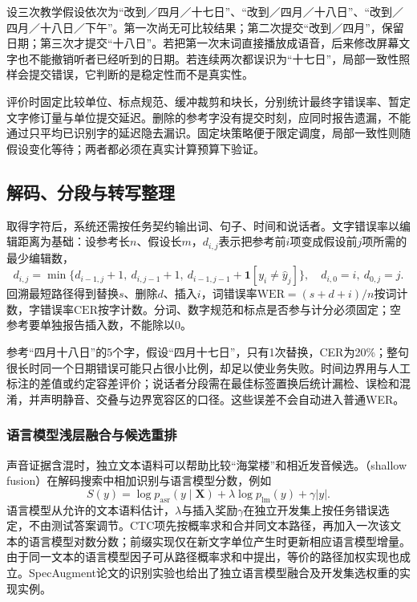 设三次教学假设依次为“改到／四月／十七日”、“改到／四月／十八日”、“改到／四月／十八日／下午”。第一次尚无可比较结果；第二次提交“改到／四月”，保留日期；第三次才提交“十八日”。若把第一次末词直接播放成语音，后来修改屏幕文字也不能撤销听者已经听到的日期。若连续两次都误识为“十七日”，局部一致性照样会提交错误，它判断的是稳定性而不是真实性。

评价时固定比较单位、标点规范、缓冲裁剪和块长，分别统计最终字错误率、暂定文字修订量与单位提交延迟。删除的参考字没有提交时刻，应同时报告遗漏，不能通过只平均已识别字的延迟隐去漏识。固定块策略便于限定调度，局部一致性则随假设变化等待；两者都必须在真实计算预算下验证。

\subsection{解码、分段与转写整理}
\label{sec:nlp-speech-postprocessing}

取得字符后，系统还需按任务契约输出词、句子、时间和说话者。文字错误率以编辑距离为基础：设参考长$n$、假设长$m$，$d_{i,j}$表示把参考前$i$项变成假设前$j$项所需的最少编辑数，
\begin{equation}
 d_{i,j}=\min\{d_{i-1,j}+1,\ d_{i,j-1}+1,\
              d_{i-1,j-1}+\mathbf{1}[y_i\ne\hat y_j]\},
 \quad d_{i,0}=i,\ d_{0,j}=j.
 \label{eq:nlp-speech-edit-distance}
\end{equation}
回溯最短路径得到替换$s$、删除$d$、插入$i$，词错误率$\mathrm{WER}=(s+d+i)/n$按词计数，字错误率$\mathrm{CER}$按字计数。分词、数字规范和标点是否参与计分必须固定；空参考要单独报告插入数，不能除以0。

参考“四月十八日”的5个字，假设“四月十七日”，只有1次替换，CER为20\%；整句很长时同一个日期错误可能只占很小比例，却足以使业务失败。时间边界用与人工标注的差值或约定容差评价；说话者分段需在最佳标签置换后统计漏检、误检和混淆，并声明静音、交叠与边界宽容区的口径。这些误差不会自动进入普通WER。

\subsubsection{语言模型浅层融合与候选重排}
\label{sec:nlp-speech-fusion}

声音证据含混时，独立文本语料可以帮助比较“海棠楼”和相近发音候选。（shallow fusion）在解码搜索中相加识别与语言模型分数，例如
\begin{equation}
 S(y)=\log p_{\mathrm{asr}}(y\mid\bm{X})
       +\lambda\log p_{\mathrm{lm}}(y)+\gamma |y|.
 \label{eq:nlp-speech-fusion}
\end{equation}
语言模型从允许的文本语料估计，$\lambda$与插入奖励$\gamma$在独立开发集上按任务错误选定，不由测试答案调节。CTC项先按概率求和合并同文本路径，再加入一次该文本的语言模型对数分数；前缀实现仅在新文字单位产生时更新相应语言模型增量。由于同一文本的语言模型因子可从路径概率求和中提出，等价的路径加权实现也成立。SpecAugment论文的识别实验也给出了独立语言模型融合及开发集选权重的实现实例。

